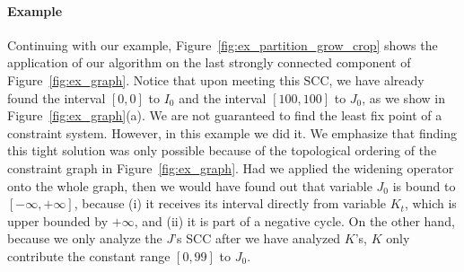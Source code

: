 \documentclass{llncs}
\begin{document}
\paragraph{Example}

Continuing with our example, Figure~\ref{fig:ex_partition_grow_crop} shows
the application of our algorithm on the last strongly connected component of
Figure~\ref{fig:ex_graph}.
Notice that upon meeting this SCC, we have already found the interval
$[0, 0]$ to $I_0$ and the interval $[100, 100]$ to $J_0$, as we show in
Figure~\ref{fig:ex_graph}(a).
We are not guaranteed to find the least fix point of a constraint system.
However, in this example we did it.
We emphasize that finding this tight solution was only possible because of
the topological ordering of the constraint graph in
Figure~\ref{fig:ex_graph}.
Had we applied the widening operator onto the whole graph, then we would
have found out that variable $J_0$ is bound to $[-\infty, +\infty]$,
because
(i) it receives its interval directly from variable $K_t$, which is upper
bounded by $+\infty$, and
(ii) it is part of a negative cycle.
On the other hand, because we only analyze the $J$'s SCC after we have
analyzed $K$'s, $K$ only contribute the constant range $[0, 99]$ to $J_0$.
\end{document}
